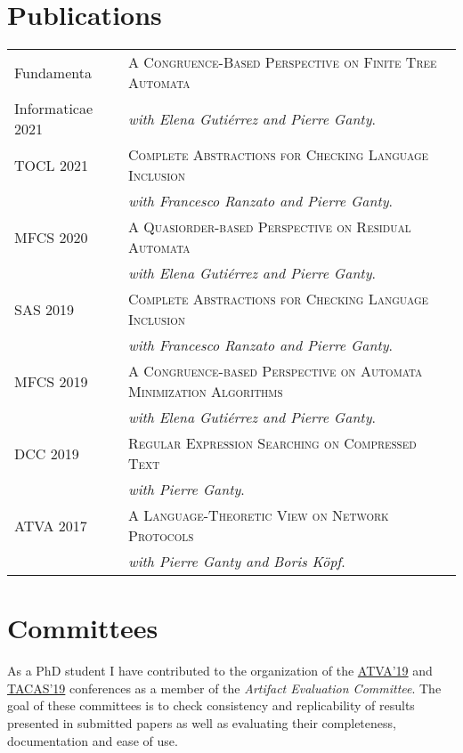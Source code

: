\documentclass[a4paper,10pt]{article} %
\begin{document}
\section{Publications}
\begin{tabular}{p{2.5cm}p{13.2cm}}
\small{Fundamenta} & \textsc{A Congruence-Based Perspective on Finite Tree Automata} \\
\small{Informaticae 2021} & \textit{with Elena Gutiérrez and Pierre Ganty}. \\
[3pt]
\small{TOCL 2021} & \textsc{Complete Abstractions for Checking Language Inclusion} \\
& \textit{with Francesco Ranzato and Pierre Ganty}. \\
[3pt]
\small{MFCS 2020} & \textsc{A Quasiorder-based Perspective on Residual Automata} \\
& \textit{with Elena Gutiérrez and Pierre Ganty}. \\
[3pt]
\small{SAS 2019} & \textsc{Complete Abstractions for Checking Language Inclusion} \\
& \textit{with Francesco Ranzato and Pierre Ganty}. \\
[3pt]
\small{MFCS 2019} & \textsc{A Congruence-based Perspective on Automata Minimization Algorithms} \\
 & \textit{with Elena Gutiérrez and Pierre Ganty}. \\
[3pt]
\small{DCC 2019} & \textsc{Regular Expression Searching on Compressed Text} \\
 & \textit{with Pierre Ganty}. \\
[3pt]
\small{ATVA 2017} & \textsc{A Language-Theoretic View on Network Protocols} \\
& \textit{with Pierre Ganty and Boris Köpf}. \\
\end{tabular}

\section{Committees}
As a PhD student I have contributed to the organization of the \href{http://atva2019.iis.sinica.edu.tw/organization/}{ATVA'19} and \href{https://conf.researchr.org/track/etaps-2019/tacas-2019-papers#Artifact-Evaluation}{TACAS'19} conferences as a member of the \emph{Artifact Evaluation Committee}.
The goal of these committees is to check consistency and replicability of results presented in submitted papers as well as evaluating their completeness, documentation and ease of use.
\end{document}
